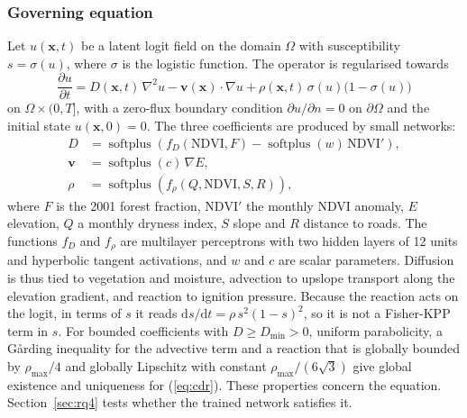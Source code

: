 \documentclass[journal]{IEEEtran}
\begin{document}
\subsubsection{Governing equation}
Let $u(\mathbf{x},t)$ be a latent logit field on the domain $\Omega$ with susceptibility $s=\sigma(u)$, where $\sigma$ is the logistic function. The operator is regularised towards
\begin{equation}
\frac{\partial u}{\partial t}= D(\mathbf{x},t)\,\nabla^{2}u-\mathbf{v}(\mathbf{x})\cdot\nabla u+\rho(\mathbf{x},t)\,\sigma(u)\bigl(1-\sigma(u)\bigr)
\label{eq:cdr}
\end{equation}
on $\Omega\times(0,T]$, with a zero-flux boundary condition $\partial u/\partial n=0$ on $\partial\Omega$ and the initial state $u(\mathbf{x},0)=0$. The three coefficients are produced by small networks:
\begin{align}
D&=\operatorname{softplus}\!\left(f_D(\mathrm{NDVI},F)-\operatorname{softplus}(w)\,\mathrm{NDVI}'\right),\label{eq:D}\\
\mathbf{v}&=\operatorname{softplus}(c)\,\nabla E,\label{eq:v}\\
\rho&=\operatorname{softplus}\!\left(f_\rho(Q,\mathrm{NDVI},S,R)\right),\label{eq:rho}
\end{align}
where $F$ is the 2001 forest fraction, $\mathrm{NDVI}'$ the monthly NDVI anomaly, $E$ elevation, $Q$ a monthly dryness index, $S$ slope and $R$ distance to roads. The functions $f_D$ and $f_\rho$ are multilayer perceptrons with two hidden layers of 12 units and hyperbolic tangent activations, and $w$ and $c$ are scalar parameters. Diffusion is thus tied to vegetation and moisture, advection to upslope transport along the elevation gradient, and reaction to ignition pressure. Because the reaction acts on the logit, in terms of $s$ it reads $\mathrm{d}s/\mathrm{d}t=\rho\,s^{2}(1-s)^{2}$, so it is not a Fisher-KPP term in $s$. For bounded coefficients with $D\ge D_{\min}>0$, uniform parabolicity, a G\aa{}rding inequality for the advective term and a reaction that is globally bounded by $\rho_{\max}/4$ and globally Lipschitz with constant $\rho_{\max}/(6\sqrt{3})$ give global existence and uniqueness for (\ref{eq:cdr}). These properties concern the equation. Section~\ref{sec:rq4} tests whether the trained network satisfies it.
\end{document}

